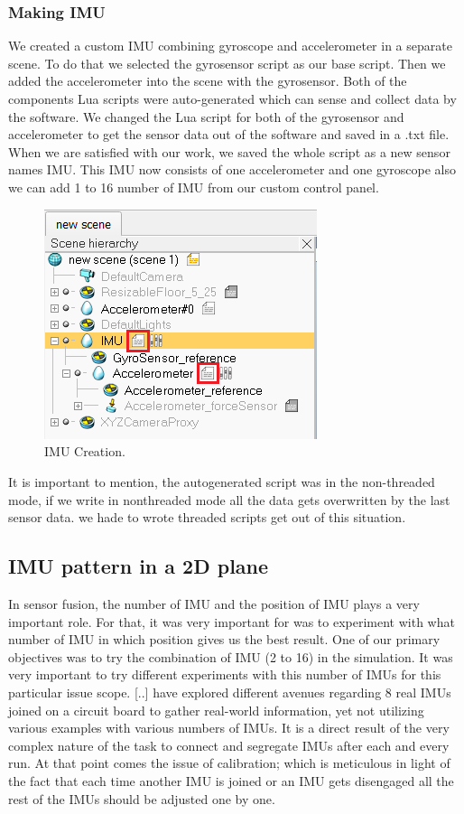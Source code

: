 \subsubsection{Making IMU}

We created a custom IMU combining gyroscope and accelerometer in a separate scene. To do that we selected the gyrosensor script as our base script. Then we added the accelerometer into the scene with the gyrosensor. Both of the components Lua scripts were auto-generated which can sense and collect data by the software. We changed the Lua script for both of the gyrosensor and accelerometer to get the sensor data out of the software and saved in a .txt file. When we are satisfied with our work, we saved the whole script as a new sensor names IMU. This IMU now consists of one accelerometer and one gyroscope also we can add 1  to 16 number of IMU from our custom control panel.

\begin{figure}[h]
  \centering
    \includegraphics[width=8cm]{figures/IMU_Creation.png}
    \caption{IMU Creation.}
\end{figure}

It is important to mention, the autogenerated script was in the non-threaded mode, if we write in nonthreaded mode all the data gets overwritten by the last sensor data. we hade to wrote threaded scripts get out of this situation.

\subsection{IMU pattern in a 2D plane}

In sensor fusion, the number of IMU and the position of IMU plays a very important role. For that, it was very important for was to experiment with what number of IMU in which position gives us the best result. One of our primary objectives was to try the combination of IMU (2 to 16) in the simulation. 
It was very important to try different experiments with this number of IMUs for this particular issue scope. 
[..] have explored different avenues regarding 8 real IMUs joined on a circuit board to gather real-world information, yet not utilizing various examples with various numbers of IMUs. It is a direct result of the very complex nature of the task to connect and segregate IMUs after each and every run. At that point comes the issue of calibration; which is meticulous in light of the fact that each time another IMU is joined or an IMU gets disengaged all the rest of the IMUs should be adjusted one by one.

